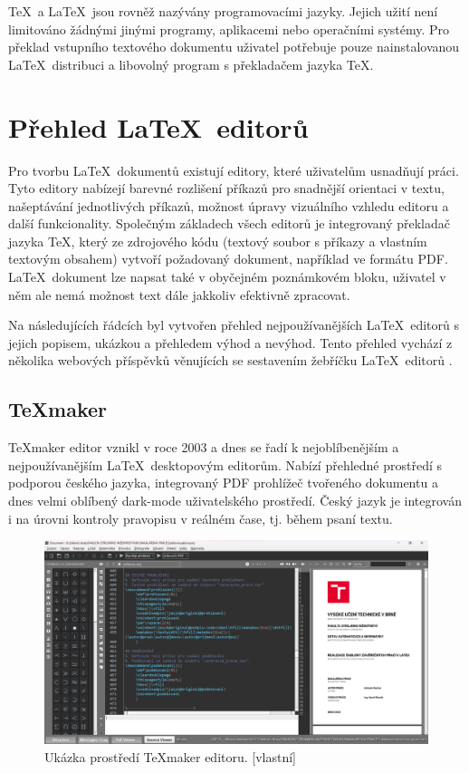 \TeX\ a \LaTeX\ jsou rovněž nazývány programovacími jazyky. Jejich užití není limitováno žádnými jinými programy, aplikacemi nebo operačními systémy. Pro překlad vstupního textového dokumentu uživatel potřebuje pouze nainstalovanou \LaTeX\ distribuci a libovolný program s překladačem jazyka \TeX. \cite{Kopka}

\section{Přehled \LaTeX\ editorů}
\label{sec:prehled}
Pro tvorbu \LaTeX\ dokumentů existují editory, které uživatelům usnadňují práci. Tyto editory nabízejí barevné rozlišení příkazů pro snadnější orientaci v textu, našeptávání jednotlivých příkazů, možnost úpravy vizuálního vzhledu editoru a další funkcionality. Společným základech všech editorů je integrovaný překladač jazyka \TeX, který ze zdrojového kódu (textový soubor s příkazy a vlastním textovým obsahem) vytvoří požadovaný dokument, například ve formátu PDF. \LaTeX\ dokument lze napsat také v obyčejném poznámkovém bloku, uživatel v něm ale nemá možnost text dále jakkoliv efektivně zpracovat.

Na následujících řádcích byl vytvořen přehled nejpoužívanějších \LaTeX\ editorů s jejich popisem, ukázkou a přehledem výhod a nevýhod. Tento přehled vychází z několika webových příspěvků věnujících se sestavením žebříčku \LaTeX\ editorů \cite{Techpout}\cite{Guru99}\cite{Beebom}.

\subsection{\TeX maker}
\TeX maker editor vznikl v roce 2003 a dnes se řadí k nejoblíbenějším a nejpoužívanějším \LaTeX\ desktopovým editorům. Nabízí přehledné prostředí s podporou českého jazyka, integrovaný PDF prohlížeč tvořeného dokumentu a dnes velmi oblíbený dark-mode uživatelského prostředí. Český jazyk je integrován i na úrovni kontroly pravopisu v reálném čase, tj. během psaní textu. \cite{texmaker}

\begin{figure}[h]
	\centering
	\includegraphics[width=\textwidth]{obrazky/texmaker.png}
	\caption[Ukázka prostředí \TeX maker editoru.]{Ukázka prostředí \TeX maker editoru. [vlastní]}
	\label{fig:texmaker}
\end{figure}

